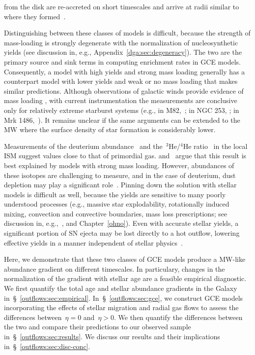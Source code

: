from the disk are re-accreted on short timescales and arrive at radii similar
to where they formed~\citep{Melioli2008, Melioli2009, Spitoni2008, Spitoni2009}.
\par
Distinguishing between these classes of models is difficult, because the
strength of mass-loading is strongly degenerate with the normalization of
nucleosynthetic yields (see discussion in, e.g.,
Appendix~\ref{dga:sec:degeneracy}).
The two are the primary source and sink terms in computing enrichment rates in
GCE models.
Consequently, a model with high yields and strong mass loading generally
has a counterpart model with lower yields and weak or no mass loading that
makes similar predictions.
Although observations of galactic winds provide evidence of mass loading
\citep[see, e.g., the review by][]{Veilleux2020}, with current
instrumentation the measurements are conclusive only for relatively extreme
starburst systems (e.g., in M82,~\citealt{Lopez2020}; in NGC 253,
\citealt{Lopez2023}; in Mrk 1486,~\citealt{Cameron2021}).
It remains unclear if the same arguments can be extended to the MW where the
surface density of star formation is considerably lower.
\par
Measurements of the deuterium abundance~\citep{Linsky2006, Prodanovic2010} and
the~$^3$He/$^4$He ratio~\citep{Balser2018} in the local ISM suggest values
close to that of primordial gas.
\citet{Weinberg2017a} and~\citet{Cooke2022} argue that this result is best
explained by models with strong mass loading.
However, abundances of these isotopes are challenging to measure, and in the
case of deuterium, dust depletion may play a significant
role~\citep{Romano2006}.
Pinning down the solution with stellar models is difficult as well, because the
yields are sensitive to many poorly understood processes (e.g., massive star
explodability, rotationally induced mixing, convection and convective
boundaries, mass loss prescriptions; see discussion in,
e.g.,~\citealt{Romano2010, Griffith2021b, Gil-Pons2022}, and
Chapter~\ref{ohno}).
Even with accurate stellar yields, a significant portion of SN ejecta may be
lost directly to a hot outflow, lowering effective yields in a manner
independent of stellar physics~\citep{Dalcanton2007, Peeples2011,
Christensen2018, Chisholm2018, Cameron2021}.
\par
Here, we demonstrate that these two classes of GCE models produce a MW-like
abundance gradient on different timescales.
In particulary, changes in the normalization of the gradient with stellar age
are a feasible empirical diagnostic.
We first quantify the total age and stellar abundance gradients in the Galaxy
in~\S~\ref{outflows:sec:empirical}.
In~\S~\ref{outflows:sec:gce}, we construct GCE models incorporating the effects
of stellar migration and radial gas flows to assess the differences
between~$\eta = 0$ and~$\eta > 0$.
We then quantify the differences between the two and compare their predictions
to our observed sample in~\S~\ref{outflows:sec:results}.
We discuss our results and their implications
in~\S~\ref{outflows:sec:disc-conc}.

